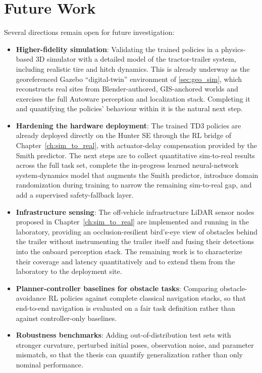 \section{Future Work}

Several directions remain open for future investigation:
\begin{itemize}
    \item \textbf{Higher-fidelity simulation}: Validating the trained policies in a physics-based 3D simulator with a detailed model of the tractor-trailer system, including realistic tire and hitch dynamics. This is already underway as the georeferenced Gazebo ``digital-twin'' environment of \cref{sec:geo_sim}, which reconstructs real sites from Blender-authored, GIS-anchored worlds and exercises the full Autoware perception and localization stack. Completing it and quantifying the policies' behaviour within it is the natural next step.
    \item \textbf{Hardening the hardware deployment}: The trained TD3 policies are already deployed directly on the Hunter SE through the RL bridge of Chapter~\ref{ch:sim_to_real}, with actuator-delay compensation provided by the Smith predictor. The next steps are to collect quantitative sim-to-real results across the full task set, complete the in-progress learned neural-network system-dynamics model that augments the Smith predictor, introduce domain randomization during training to narrow the remaining sim-to-real gap, and add a supervised safety-fallback layer.
    \item \textbf{Infrastructure sensing}: The off-vehicle infrastructure LiDAR sensor nodes proposed in Chapter~\ref{ch:sim_to_real} are implemented and running in the laboratory, providing an occlusion-resilient bird's-eye view of obstacles behind the trailer without instrumenting the trailer itself and fusing their detections into the onboard perception stack. The remaining work is to characterize their coverage and latency quantitatively and to extend them from the laboratory to the deployment site.
    \item \textbf{Planner-controller baselines for obstacle tasks}: Comparing obstacle-avoidance RL policies against complete classical navigation stacks, so that end-to-end navigation is evaluated on a fair task definition rather than against controller-only baselines.
    \item \textbf{Robustness benchmarks}: Adding out-of-distribution test sets with stronger curvature, perturbed initial poses, observation noise, and parameter mismatch, so that the thesis can quantify generalization rather than only nominal performance.

\end{itemize}
